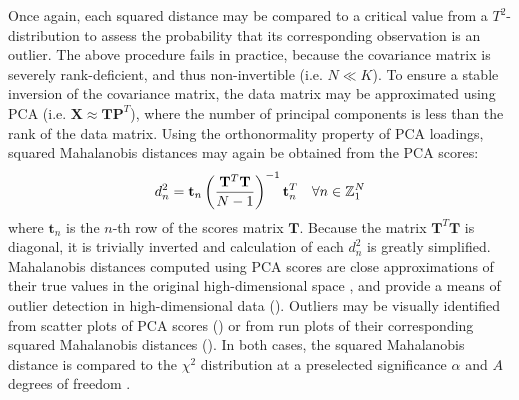 \begin{doublespace}
Once again, each squared distance may be compared to a critical value from a
$T^2$-distribution to assess the probability that its corresponding observation
is an outlier. The above procedure fails in practice, because the covariance
matrix is severely rank-deficient, and thus non-invertible (i.e. $N \ll K$).
To ensure a stable inversion of the covariance matrix, the data matrix may be
approximated using PCA (i.e. $\mathbf{X} \approx \mathbf{T} \mathbf{P}^T$),
where the number of principal components is less than the rank of the data
matrix. Using the orthonormality property of PCA loadings, squared Mahalanobis
distances may again be obtained from the PCA scores:
\begin{equation}
d_n^2 =
 \mathbf{t}_n
 \left( \frac{\mathbf{T}^T \mathbf{T}}{N - 1} \right)^{-1}
 \mathbf{t}_n^T
 \quad \forall n \in \mathbb{Z}_{1}^{N}
\end{equation}
where $\mathbf{t}_n$ is the $n$-th row of the scores matrix $\mathbf{T}$.
Because the matrix $\mathbf{T}^T \mathbf{T}$ is diagonal, it is trivially
inverted and calculation of each $d_n^2$ is greatly simplified. Mahalanobis
distances computed using PCA scores are close approximations of their true
values in the original high-dimensional space \cite{demaesschalck:cils2000},
and provide a means of outlier detection in high-dimensional data
(). Outliers may be visually identified from scatter
plots of PCA scores () or from run plots of their
corresponding squared Mahalanobis distances ().
In both cases, the squared Mahalanobis distance is compared to the
$\chi^2$ distribution at a preselected significance $\alpha$ and $A$
degrees of freedom \cite{hotelling:ams1931,worley:abio2013}.
\end{doublespace}

